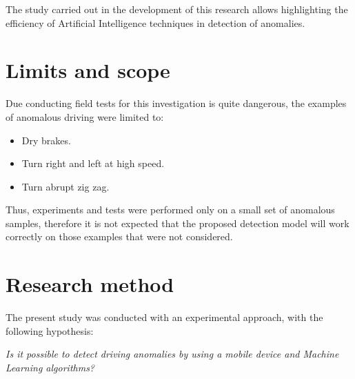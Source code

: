 The study carried out in the development of this research allows highlighting the efficiency of Artificial Intelligence techniques in  detection of anomalies.

\section{Limits and scope}

Due conducting field tests for this investigation is quite dangerous, the examples of anomalous driving were limited to:
\begin{itemize}
\item Dry brakes.
\item Turn right and left at high speed.
\item Turn abrupt zig zag.
\end{itemize}

\vspace{5mm} %

Thus, experiments and tests were performed only on a small set of anomalous samples, therefore it is not expected that the proposed detection model will work correctly on those examples that were not considered.

\section{Research method}

The present study was conducted with an experimental approach, with the following hypothesis:


\begin{center}
\textit{\large{Is it possible to detect driving anomalies by using a mobile device and Machine Learning algorithms?}}
\end{center}

